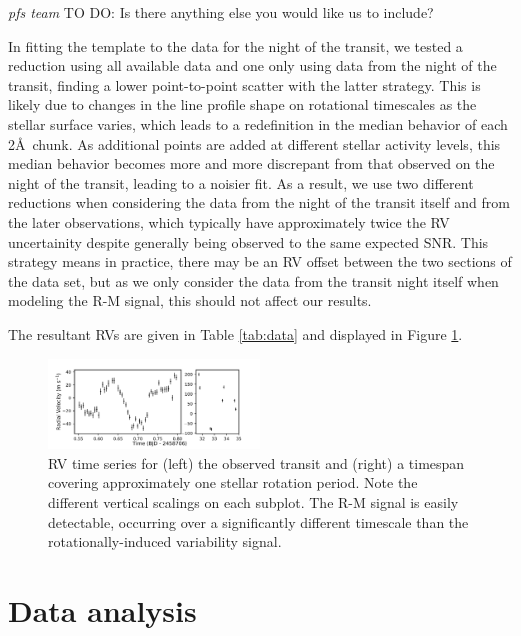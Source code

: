 \documentclass[twocolumn]{aastex63}
\newcommand{\todo}[3]{{\color{#2} \emph{#1} TO DO: #3}}
\begin{document}
\todo{pfs team}{red}{Is there anything else you would like us to include?}

In fitting the template to the data for the night of the transit, we tested a reduction using all available data and one only using data from the night of the transit, finding a lower point-to-point scatter with the latter strategy. 
This is likely due to changes in the line profile shape on rotational timescales as the stellar surface varies, which leads to a redefinition in the median behavior of each 2\AA\ chunk.
As additional points are added at different stellar activity levels, this median behavior becomes more and more discrepant from that observed on the night of the transit, leading to a noisier fit. 
As a result, we use two different reductions when considering the data from the night of the transit itself and from the later observations, which typically have approximately twice the RV uncertainity despite generally being observed to the same expected SNR.
This strategy means in practice, there may be an RV offset between the two sections of the data set, but as we only consider the data from the transit night itself when modeling the R-M signal, this should not affect our results.

The resultant RVs are given in Table \ref{tab:data} and displayed in Figure \ref{fig:data}.



\begin{figure}[!tbh]
  \begin{center}
    \includegraphics[width=0.5\textwidth, trim={0cm 0.0cm 0cm 0cm}, clip=true]{../figures/all_data.pdf}
   \end{center}
  \caption{RV time series for (left) the observed transit and (right) a timespan covering approximately one stellar rotation period. Note the different vertical scalings on each subplot. The R-M signal is easily detectable, occurring over a significantly different timescale than the rotationally-induced variability signal.}
  \label{fig:data}
\end{figure}



\section{Data analysis}
\label{sec:analysis}
\end{document}

